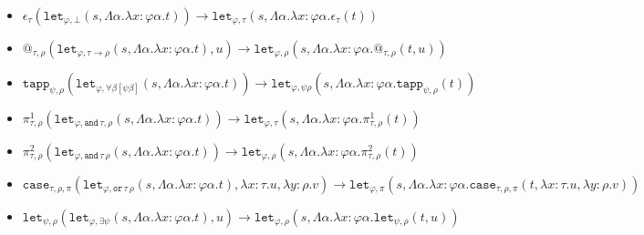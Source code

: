 \documentclass[runningheads,a4paper]{llncs}
\newcommand{\red}{\longrightarrow}
\newcommand{\arrtype}{\rightarrow}
\newcommand{\abs}[2]{\lambda #1.#2}
\newcommand{\tabs}[2]{\Lambda #1.#2}
\begin{document}
\begin{itemize}
\item
  $\epsilon_\tau(\mathtt{let}_{\varphi,\bot}(s,\tabs{\alpha}{\abs{x:\varphi\alpha}{t}}))
  \red
  \mathtt{let}_{\varphi,\tau}(s,\tabs{\alpha}{\abs{x:\varphi\alpha}{\epsilon_\tau(t)}})$
\item $@_{\tau,\rho}(\mathtt{let}_{\varphi, \tau \arrtype
  \rho}(s,\tabs{\alpha}{\abs{x:\varphi\alpha}{t}}),u) \red
  \mathtt{let}_{\varphi,\rho}(s,\tabs{\alpha}{\abs{x:\varphi\alpha}{@_{\tau,\rho}(t,
      u)}})$
\item
  $\mathtt{tapp}_{\psi,\rho}(\mathtt{let}_{\varphi,\forall\beta[\psi\beta]}(s,\tabs{\alpha}{\abs{x:\varphi\alpha}{t}}))
  \red
  \mathtt{let}_{\varphi,\psi\rho}(s,\tabs{\alpha}{\abs{x:\varphi\alpha}{\mathtt{tapp}_{\psi,\rho}(t)}})$
\item
  $\pi^1_{\tau,\rho}(\mathtt{let}_{\varphi,
  \mathtt{and}\,\tau,\rho}(s,\tabs{\alpha}{\abs{x:\varphi\alpha}{t}}))
  \red
  \mathtt{let}_{\varphi,\tau}(s,\tabs{\alpha}{\abs{x:\varphi\alpha}{\pi^1_{\tau,
        \rho}(t)}})$
\item
  $\pi^2_{\tau,\rho}(\mathtt{let}_{\varphi,
  \mathtt{and}\,\tau\,\rho}(s,\tabs{\alpha}{\abs{x:\varphi\alpha}{t}}))
  \red
  \mathtt{let}_{\varphi,\rho}(s,\tabs{\alpha}{\abs{x:\varphi\alpha}{\pi^2_{\tau,\rho}(t)}})$
\item $\mathtt{case}_{\tau,\rho,\pi}(
  \mathtt{let}_{\varphi,\mathtt{or}\,\tau\,\rho}(s,\tabs{\alpha}{\abs{x:\varphi\alpha}{t}}),\abs{x:\tau}{u},\abs{y:\rho}{v})
  \red
  \mathtt{let}_{\varphi,\pi}(s,\tabs{\alpha}{\abs{x:\varphi\alpha}{\mathtt{case}_{\tau,\rho,\pi}(t,\abs{x:\tau}{u},\abs{y:\rho}{v})}})$
\item
  $\mathtt{let}_{\psi,\rho}(\mathtt{let}_{\varphi,\exists\psi}(s,\tabs{\alpha}{\abs{x:\varphi\alpha}{t}}),u)
  \red
  \mathtt{let}_{\varphi,\rho}(s,\tabs{\alpha}{\abs{x:\varphi\alpha}{\mathtt{let}_{\psi,\rho}(t,u)}})$
\end{itemize}
\end{document}
